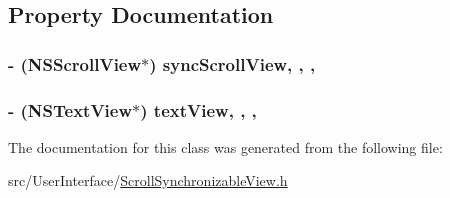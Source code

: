 \subsection{Property Documentation}
\hypertarget{interface_scroll_synchronizable_view_a9dfdd7617a70252b6822ae03391b4c3d}{
\subsubsection[{sync\-Scroll\-View}]{\setlength{\rightskip}{0pt plus 5cm}-\/ (N\-S\-Scroll\-View$\ast$) sync\-Scroll\-View\hspace{0.3cm}{\ttfamily [read]}, {\ttfamily [write]}, {\ttfamily [atomic]}, {\ttfamily [assign]}}}\label{interface_scroll_synchronizable_view_a9dfdd7617a70252b6822ae03391b4c3d}
\hypertarget{interface_scroll_synchronizable_view_a910e28e896d7876ad29220c888fbc82a}{
\subsubsection[{text\-View}]{\setlength{\rightskip}{0pt plus 5cm}-\/ (N\-S\-Text\-View$\ast$) text\-View\hspace{0.3cm}{\ttfamily [read]}, {\ttfamily [write]}, {\ttfamily [atomic]}, {\ttfamily [assign]}}}\label{interface_scroll_synchronizable_view_a910e28e896d7876ad29220c888fbc82a}


The documentation for this class was generated from the following file\-:\begin{DoxyCompactItemize}
\item 
src/\-User\-Interface/\hyperlink{_scroll_synchronizable_view_8h}{Scroll\-Synchronizable\-View.\-h}\end{DoxyCompactItemize}

